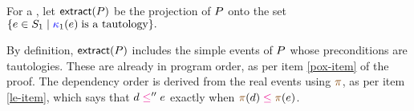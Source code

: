 \begin{definition}
  For a \PwTpo{}, let $\fextract{\aPS}$ be the projection
  of $P$ onto the set
  \begin{math}
    \{e\in S_1\mid\allowbreak {\color{blue}\kappa}_1(e) \;\text{is a tautology} \}.
  \end{math}
\end{definition}
By definition, $\fextract{\aPS}$ includes the simple events of $P$ whose
preconditions are tautologies.  These are already in program order, as per
item \ref{pox-item} of the proof.  The dependency order is derived from the
real events using $\fmrg{}$, as per item \ref{le-item}, which says that
${\bEv}\le'' {\aEv}$ exactly when $\fmrg{\bEv}\le\fmrg{\aEv}$.

